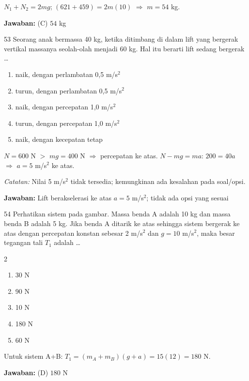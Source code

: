 \documentclass[11pt]{article}
\newenvironment{pil}{%
  \begin{enumerate}[label=(\Alph*),leftmargin=*,itemsep=1pt,topsep=3pt]}%
  {\end{enumerate}}
\newenvironment{pilB}{%
  \par\smallskip\begin{multicols}{2}
  \begin{enumerate}[label=(\Alph*),leftmargin=*,itemsep=1pt,topsep=3pt]}%
  {\end{enumerate}\end{multicols}}
\newcommand{\jawaban}[1]{%
  \noindent\colorbox{gold!30}{\parbox{\dimexpr\linewidth-2\fboxsep\relax}{%
    \textbf{Jawaban:} #1}}\par\smallskip}
\begin{document}
\begin{pembox}
$N_1+N_2=2mg$; $(621+459)=2m(10)$ $\Rightarrow$ $m=54$ kg.
\jawaban{(C) $54$ kg}
\end{pembox}

\begin{soal}{53}
Seorang anak bermassa 40 kg, ketika ditimbang di dalam lift yang bergerak
vertikal massanya seolah-olah menjadi 60 kg. Hal itu berarti lift sedang
bergerak \ldots
\begin{pil}
  \item naik, dengan perlambatan 0,5 m/s$^2$
  \item turun, dengan perlambatan 0,5 m/s$^2$
  \item naik, dengan percepatan 1,0 m/s$^2$
  \item turun, dengan percepatan 1,0 m/s$^2$
  \item naik, dengan kecepatan tetap
\end{pil}
\end{soal}

\begin{pembox}
$N=600$ N $>$ $mg=400$ N $\Rightarrow$ percepatan ke atas. $N-mg=ma$: $200=40a$ $\Rightarrow$ $a=5$ m/s$^2$ ke atas.

\textit{Catatan:} Nilai 5 m/s$^2$ tidak tersedia; kemungkinan ada kesalahan pada soal/opsi.
\jawaban{Lift berakselerasi ke atas $a=5$ m/s$^2$; tidak ada opsi yang sesuai}
\end{pembox}

\begin{soal}{54}
Perhatikan sistem pada gambar. Massa benda A adalah 10 kg dan massa
benda B adalah 5 kg. Jika benda A ditarik ke atas sehingga sistem
bergerak ke atas dengan percepatan konstan sebesar 2 m/s$^2$ dan
$g=10$ m/s$^2$, maka besar tegangan tali $T_1$ adalah \ldots
\begin{pilB}
  \item 30 N \item 90 N \item 10 N \item 180 N \item 60 N
\end{pilB}
\end{soal}

\begin{pembox}
Untuk sistem A+B: $T_1=(m_A+m_B)(g+a)=15(12)=180$ N.
\jawaban{(D) $180$ N}
\end{pembox}
\end{document}
